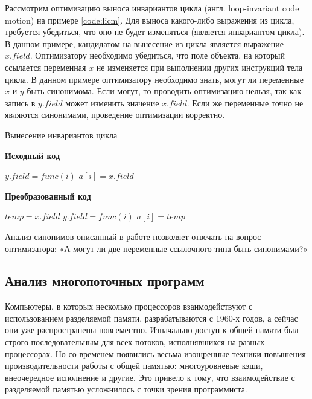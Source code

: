\documentclass[14pt,titlepage]{extarticle}
\newcommand{\algorithmictitle}[1]{\hspace{8mm}\textbf{#1}}
\newcommand{\eng}[1]{{\English#1}}
\begin{document}
      Рассмотрим оптимизацию выноса инвариантов цикла (англ.
      \eng{loop-invariant code motion}) на примере \ref{code:licm}.
      Для выноса какого-либо выражения из цикла, требуется убедиться, что оно
      не будет изменяться (является инвариантом цикла).
      В данном примере, кандидатом на вынесение из цикла является выражение
      $x.field$. Оптимизатору необходимо убедиться, что поле объекта, на
      который ссылается переменная $x$ не изменяется при выполнении других
      инструкций тела цикла. В данном примере оптимизатору необходимо знать,
      могут ли переменные $x$ и $y$ быть синонимома. Если могут, то
      проводить оптимизацию нельзя, так как запись в $y.field$ может изменить
      значение $x.field$. Если же переменные точно не являются синонимами,
      проведение оптимизации корректно.

      \begin{algorithm}
        \caption{Вынесение инвариантов цикла}
        \label{code:licm}
        \begin{multicols*}{2}
          \algorithmictitle{Исходный код}
          \begin{algorithmic}[1]
            \STATE $y.field = func(i)$
            \STATE $a[i] = x.field$
            \ENDFOR
          \end{algorithmic}
          \columnbreak
          \algorithmictitle{Преобразованный код}
          \begin{algorithmic}[1]
            \STATE $temp = x.field$
            \STATE $y.field = func(i)$
            \STATE $a[i] = temp$
            \ENDFOR
          \end{algorithmic}
        \end{multicols*}
      \end{algorithm}

      Анализ синонимов описанный в работе позволяет отвечать на
      вопрос оптимизатора: «А могут ли две переменные ссылочного типа быть
      синонимами?»

    \subsection{Анализ многопоточных программ}

      Компьютеры, в которых несколько процессоров взаимодействуют с
      использованием разделяемой памяти, разрабатываются с 1960-х годов, а
      сейчас они уже распространены повсеместно. Изначально доступ к общей
      памяти был строго последовательным для всех потоков, исполнявшихся на
      разных процессорах. Но со временем появились весьма изощренные техники
      повышения производительности работы с общей памятью: многоуровневые кэши,
      внеочередное исполнение и другие. Это привело к тому, что взаимодействие
      с разделяемой памятью усложнилось с точки зрения программиста.
\end{document}
